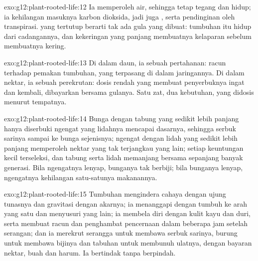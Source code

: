 \begin{solution}{exo:g12:plant-rooted-life:12}
Ia memperoleh air, sehingga  tetap tegang dan hidup; ia
kehilangan masuknya karbon dioksida, jadi juga , serta
pendinginan oleh transpirasi.  yang tertutup berarti tak ada gula
yang dibuat: tumbuhan itu hidup dari cadangannya, dan kekeringan yang
panjang membuatnya kelaparan sebelum membuatnya kering.
\end{solution}

\begin{solution}{exo:g12:plant-rooted-life:13}
Di dalam daun, ia sebuah pertahanan: racun terhadap pemakan tumbuhan,
yang terpasang di dalam jaringannya. Di dalam nektar, ia sebuah
perekrutan: dosis rendah yang membuat penyerbuknya ingat dan kembali,
dibayarkan bersama gulanya. Satu zat, dua kebutuhan, yang didosis
menurut tempatnya.
\end{solution}

\begin{solution}{exo:g12:plant-rooted-life:14}
Bunga dengan tabung yang sedikit lebih panjang hanya diserbuki ngengat
yang lidahnya mencapai dasarnya, sehingga serbuk sarinya sampai ke
bunga sejenisnya; ngengat dengan lidah yang sedikit lebih panjang
memperoleh nektar yang tak terjangkau yang lain; setiap keuntungan
kecil terseleksi, dan tabung serta lidah memanjang bersama sepanjang
banyak generasi. Bila ngengatnya lenyap, bunganya tak berbiji; bila
bunganya lenyap, ngengatnya kehilangan satu-satunya makanannya.
\end{solution}

\begin{solution}{exo:g12:plant-rooted-life:15}
Tumbuhan mengindera cahaya dengan ujung tunasnya dan gravitasi dengan
akarnya; ia menanggapi dengan tumbuh ke arah yang satu dan menyusuri
yang lain; ia membela diri dengan kulit kayu dan duri, serta membuat
racun dan penghambat pencernaan dalam beberapa jam setelah serangan;
dan ia merekrut serangga untuk membawa serbuk sarinya, burung untuk
membawa bijinya dan tabuhan untuk membunuh ulatnya, dengan bayaran
nektar, buah dan harum. Ia bertindak tanpa berpindah.
\end{solution}

